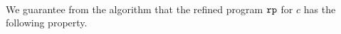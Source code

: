 %
\\
We guarantee from the algorithm that the refined program $\mathtt{rp}$ for $c$ has the following property.
